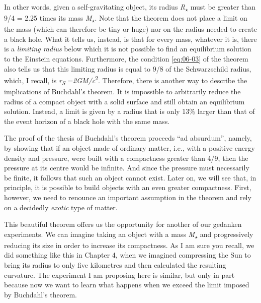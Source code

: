 In other words, given a self-gravitating object, its radius \emph{R}\textsubscript{\(\star\)}
must be greater than 9/4 = 2.25 times its mass \emph{M}\textsubscript{\(\star\)}. Note that the
theorem does not place a limit on the mass (which can therefore be tiny or huge) nor on
the radius needed to create a black hole. What it tells us, instead, is that for every
mass, whatever it is, there is a \emph{limiting radius} below which it is not possible
to find an equilibrium solution to the Einstein equations.
Furthermore, the condition \eqref{eq:06-03} of the theorem also tells us that this limiting radius
is equal to 9/8 of the Schwarzschild radius, which, I recall, is \emph{r\textsubscript{S
}}=\emph{2GM/c}\textsuperscript{2}. Therefore, there is another way to describe the
implications of Buchdahl's theorem. It is impossible to arbitrarily reduce the radius of
a compact object with a solid surface and still obtain an equilibrium solution. Instead,
a limit is given by a radius that is only 13\% larger than that of the event
horizon of a black hole with the same mass.

The proof of the thesis of Buchdahl's theorem proceeds ``ad absurdum'', namely, by
showing that if an object made of ordinary matter, i.e., with a positive energy density
and pressure, were built with a compactness greater than 4/9, then the pressure at its
centre would be infinite. And since the pressure must necessarily be finite, it follows
that such an object cannot exist. Later on, we will see that, in principle, it is
possible to build objects with an even greater compactness. First, however, we need to
renounce an important assumption in the theorem and rely on a decidedly
\emph{exotic} type of matter.

This beautiful theorem offers us the opportunity for another of our gedanken
experiments.  We can imagine taking an object with a mass
\emph{M}\textsubscript{\(\star\)} and progressively reducing its size in order to increase its
compactness. As I am sure you recall, we did something like this in Chapter 4, when we
imagined compressing the Sun to bring its radius to only five kilometres and then
calculated the resulting curvature. The experiment I am proposing here is similar, but
only in part because now we want to learn what happens when we exceed the limit imposed
by Buchdahl's theorem.

